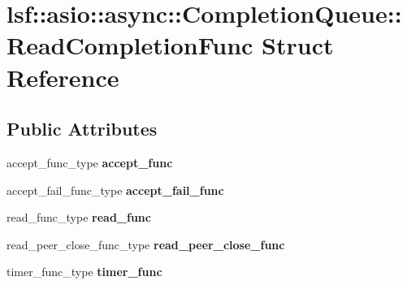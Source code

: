 \hypertarget{structlsf_1_1asio_1_1async_1_1CompletionQueue_1_1ReadCompletionFunc}{
\section{lsf::asio::async::CompletionQueue::ReadCompletionFunc Struct Reference}
\label{structlsf_1_1asio_1_1async_1_1CompletionQueue_1_1ReadCompletionFunc}
}
\subsection*{Public Attributes}
\begin{DoxyCompactItemize}
\item 
\hypertarget{structlsf_1_1asio_1_1async_1_1CompletionQueue_1_1ReadCompletionFunc_a224cf36c7a36e120e62ca7b4aeb4fafb}{
accept\_\-func\_\-type {\bfseries accept\_\-func}}
\label{structlsf_1_1asio_1_1async_1_1CompletionQueue_1_1ReadCompletionFunc_a224cf36c7a36e120e62ca7b4aeb4fafb}

\item 
\hypertarget{structlsf_1_1asio_1_1async_1_1CompletionQueue_1_1ReadCompletionFunc_a5a4beb2041b17203401017fa220cc91d}{
accept\_\-fail\_\-func\_\-type {\bfseries accept\_\-fail\_\-func}}
\label{structlsf_1_1asio_1_1async_1_1CompletionQueue_1_1ReadCompletionFunc_a5a4beb2041b17203401017fa220cc91d}

\item 
\hypertarget{structlsf_1_1asio_1_1async_1_1CompletionQueue_1_1ReadCompletionFunc_a828b87469f52210104ca6f96af2db3f4}{
read\_\-func\_\-type {\bfseries read\_\-func}}
\label{structlsf_1_1asio_1_1async_1_1CompletionQueue_1_1ReadCompletionFunc_a828b87469f52210104ca6f96af2db3f4}

\item 
\hypertarget{structlsf_1_1asio_1_1async_1_1CompletionQueue_1_1ReadCompletionFunc_a31f318f345ea74c9f7c5f80404fcbf32}{
read\_\-peer\_\-close\_\-func\_\-type {\bfseries read\_\-peer\_\-close\_\-func}}
\label{structlsf_1_1asio_1_1async_1_1CompletionQueue_1_1ReadCompletionFunc_a31f318f345ea74c9f7c5f80404fcbf32}

\item 
\hypertarget{structlsf_1_1asio_1_1async_1_1CompletionQueue_1_1ReadCompletionFunc_aed3653191754c4ab74fe32924c183756}{
timer\_\-func\_\-type {\bfseries timer\_\-func}}
\label{structlsf_1_1asio_1_1async_1_1CompletionQueue_1_1ReadCompletionFunc_aed3653191754c4ab74fe32924c183756}


\end{DoxyCompactItemize}
